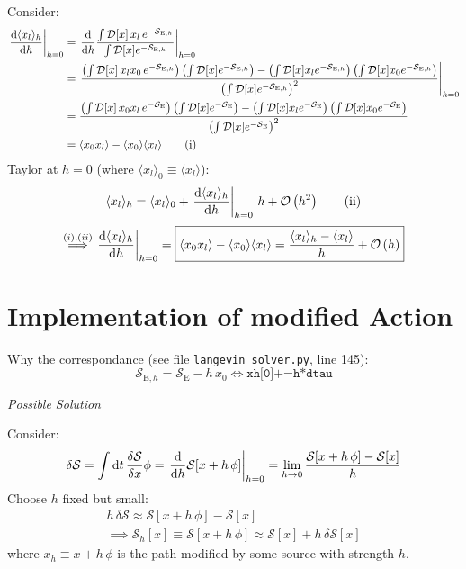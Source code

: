 \documentclass[11pt,a4paper]{scrartcl}
\newcommand{\action}{\ensuremath{\mathcal{S}}}
\newcommand{\avg}[1]{\langle#1\rangle}
\newcommand{\SE}{\mathcal{S}_{\mathrm{E}}}
\newcommand{\SEh}{\mathcal{S}_{\mathrm{E},h}}
\newcommand{\pathinth}[1]{\int\mathcal{D}[x]#1e^{-\SEh}}
\newcommand{\pathint}[1]{\int\mathcal{D}[x]#1e^{-\SE}}
\newcommand{\BigO}[1]{\mathcal{O}\left(#1\right)}
\begin{document}
Consider:
\begin{align*}
    \eval{\dv{\avg{x_l}_h}{h}}_{h=0} &=
    \eval{\dv{h}\frac{\pathinth{\,x_l\,}}{\pathinth{}}}_{h=0} \\ &=
    \eval{\frac{\left(\pathinth{\,x_l x_0\,}\right)\left(\pathinth{}\right)
    -\left(\pathinth{x_l}\right)\left(\pathinth{x_0}\right)}
    {\left(\pathinth{}\right)^2}}_{h=0} \\ &=
    \frac{\left(\pathint{\,x_0 x_l\,}\right)\left(\pathint{}\right)
    -\left(\pathint{x_l}\right)\left(\pathint{x_0}\right)}
    {\left(\pathint{}\right)^2} \\ &=
    \avg{x_0 x_l}-\avg{x_0}\avg{x_l} \tag{i}
\end{align*}
Taylor at $h=0$ (where $\avg{x_l}_0\equiv\avg{x_l}$):
\begin{equation*}
    \avg{x_l}_h=\avg{x_l}_0+\eval{\dv{\avg{x_l}_h}{h}}_{h=0}\,h+\BigO{h^2}
    \tag{ii}
\end{equation*}
\begin{equation*}
    \overset{(i),(ii)}{\implies}\eval{\dv{\avg{x_l}_h}{h}}_{h=0}
    =\boxed{\avg{x_0 x_l}-\avg{x_0}\avg{x_l}
    =\frac{\avg{x_l}_h-\avg{x_l}}{h}+\BigO{h}}
\end{equation*}


\section*{Implementation of modified Action}
Why the correspondance (see file \texttt{langevin\_solver.py}, line 145):
\begin{equation*}
    \SEh=\SE-h\,x_0 \iff \texttt{xh[0]+=h*dtau}
\end{equation*}

\emph{Possible Solution}

Consider:
\begin{equation*}
    \delta\action=\int\dd{t}\fdv{\action}{x}\phi=\eval{\dv{h}\action[x+h\,\phi]}_{h=0}
    =\lim_{h\to 0}\frac{\action[x+h\,\phi]-\action[x]}{h}
\end{equation*}
Choose $h$ fixed but small:
\begin{gather*}
    h\,\delta\action\approx\action[x+h\,\phi]-\action[x]\\
    \implies\action_{h}[x]\equiv\action[x+h\,\phi]\approx\action[x]+h\,\delta\action[x]
\end{gather*}
where $x_h\equiv x+h\,\phi$ is the path modified by some source with strength
$h$.
\end{document}

